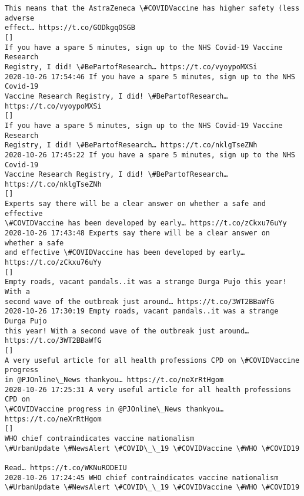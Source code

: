 \documentclass[11pt]{article}
\begin{document}
\begin{Verbatim}[commandchars=\\\{\}]
This means that the AstraZeneca \#COVIDVaccine has higher safety (less adverse
effect… https://t.co/GODkgqOSGB
[]
If you have a spare 5 minutes, sign up to the NHS Covid-19 Vaccine Research
Registry, I did! \#BePartofResearch… https://t.co/vyoypoMXSi
2020-10-26 17:54:46 If you have a spare 5 minutes, sign up to the NHS Covid-19
Vaccine Research Registry, I did! \#BePartofResearch… https://t.co/vyoypoMXSi
[]
If you have a spare 5 minutes, sign up to the NHS Covid-19 Vaccine Research
Registry, I did! \#BePartofResearch… https://t.co/nklgTseZNh
2020-10-26 17:45:22 If you have a spare 5 minutes, sign up to the NHS Covid-19
Vaccine Research Registry, I did! \#BePartofResearch… https://t.co/nklgTseZNh
[]
Experts say there will be a clear answer on whether a safe and effective
\#COVIDVaccine has been developed by early… https://t.co/zCkxu76uYy
2020-10-26 17:43:48 Experts say there will be a clear answer on whether a safe
and effective \#COVIDVaccine has been developed by early… https://t.co/zCkxu76uYy
[]
Empty roads, vacant pandals..it was a strange Durga Pujo this year! With a
second wave of the outbreak just around… https://t.co/3WT2BBaWfG
2020-10-26 17:30:19 Empty roads, vacant pandals..it was a strange Durga Pujo
this year! With a second wave of the outbreak just around…
https://t.co/3WT2BBaWfG
[]
A very useful article for all health professions CPD on \#COVIDVaccine progress
in @PJOnline\_News thankyou… https://t.co/neXrRtHgom
2020-10-26 17:25:31 A very useful article for all health professions CPD on
\#COVIDVaccine progress in @PJOnline\_News thankyou… https://t.co/neXrRtHgom
[]
WHO chief contraindicates vaccine nationalism
\#UrbanUpdate \#NewsAlert \#COVID\_\_19 \#COVIDVaccine \#WHO \#COVID19

Read… https://t.co/WKNuRODEIU
2020-10-26 17:24:45 WHO chief contraindicates vaccine nationalism
\#UrbanUpdate \#NewsAlert \#COVID\_\_19 \#COVIDVaccine \#WHO \#COVID19


\end{Verbatim}
\end{document}
